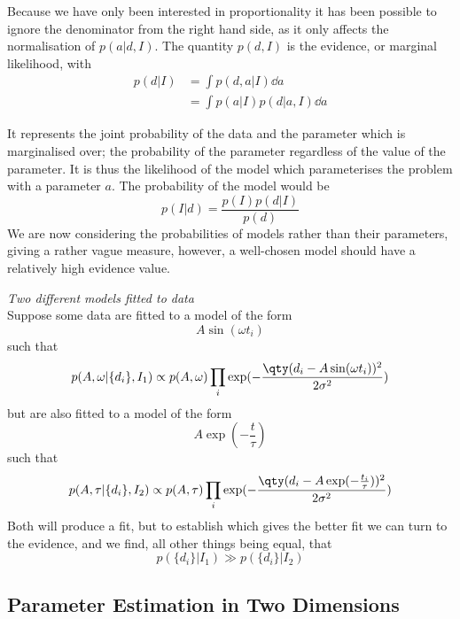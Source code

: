\documentclass{dwnotes}         		        %
\begin{document}
Because we have only been interested in proportionality it has been
possible to ignore the denominator from the right hand side, as it
only affects the normalisation of $p(a|d,I)$. The quantity $p(d,I)$ is
the evidence, or marginal likelihood, with
\begin{align*}
  p(d|I) &= \int p(d, a|I) \dd{a} \\ &= \int p(a|I) p(d|a,I) \dd{a} 
\end{align*}

It represents the joint probability of the data and the parameter
which is marginalised over; the probability of the parameter
regardless of the value of the parameter. It is thus the likelihood of
the model which parameterises the problem with a parameter $a$. The
probability of the model would be
\[ p(I|d) = \frac{p(I) p(d|I)}{p(d)} \] We are now considering the
probabilities of models rather than their parameters, giving a rather
vague measure, however, a well-chosen model should have a relatively
high evidence value.

\begin{example}{\em Two different models fitted to data}\\
  Suppose some data are fitted to a model of the form
  \[A \sin(\omega t_i) \] such that
\[ p(A, \omega | \{ d_i \}, I_1) \propto p(A, \omega) \prod_i \exp( - \frac{\qty(d_i - A \sin(\omega t_i))^2}{2 \sigma^2} ) \]
but are also fitted to a model of the form
\[ A \exp( - \frac{t}{\tau} ) \] such that
\[ p(A,\tau | \{ d_i \}, I_2) \propto p(A, \tau) \prod_i \exp( -
\frac{\qty(d_i - A \exp( - \frac{t_i}{\tau}) )^2}{2 \sigma^2} ) \]
Both will produce a fit, but to establish which gives the better fit
we can turn to the evidence, and we find, all other things being
equal, that \[ p( \{ d_i \} | I_1) \gg p( \{ d_i \} | I_2) \]
\end{example}

\subsection{Parameter Estimation in Two Dimensions}
\label{sec:param-estim-two}
\end{document}
